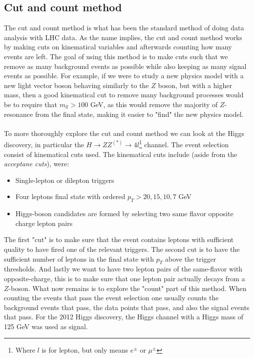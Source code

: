 \documentclass[12pt, a4paper]{book}
\begin{document}
\subsection{Cut and count method}
The cut and count method is what has been the standard method of doing data analysis with LHC data. As the name implies, the cut and count method works by making cuts on kinematical variables and afterwards counting how many events are left. 
The goal of using this method is to make cuts such that we remove as many background events as possible while also keeping as many signal events as possible. For example, if we were to study a new physics model with a new light vector boson behaving similarly to the $Z$ boson, but with a higher mass, 
then a good kinematical cut to remove many background processes would be to require that $m_{ll}>100$ GeV, as this would remove the majority of $Z$-resonance from the final state, making it easier to "find" the new physics model. \\
\\To more thoroughly explore the cut and count method we can look at the Higgs discovery, in particular the $H\rightarrow ZZ^{(*)} \rightarrow 4l$\footnote{Where $l$ is for lepton, but only means $e^\pm$ or $\mu^\pm$} channel. 
The event selection consist of kinematical cuts used. The kinematical cuts include (aside from the \textit{acceptane cuts}), were:
\begin{itemize}
    \item Single-lepton or dilepton triggers
    \item Four leptons final state with ordered $p_T >20,15,10,7$ GeV
    \item Higgs-boson candidates are formed by selecting two same flavor opposite charge lepton pairs
\end{itemize}
The first "cut" is to make sure that the event contains leptons with sufficient quality to have fired one of the relevant triggers. The second cut is to have the sufficient number of leptons in the final state with $p_T$ above the trigger thresholds. And lastly we want to have two lepton pairs of the same-flavor 
with opposite-charge, this is to make sure that one lepton pair actually decays from a $Z$-boson. What now remains is to explore the "count" part of this method. When counting the events that pass the event selection one usually counts the background events that pass, the data 
points that pass, and also the signal events that pass. For the 2012 Higgs discovery, the Higgs channel with a Higgs mass of 125 GeV was used as signal. 
\end{document}
